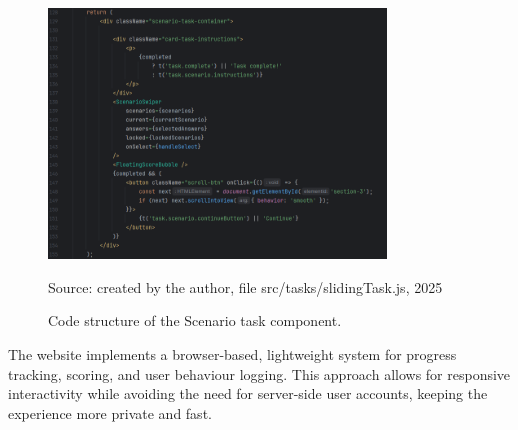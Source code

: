 \begin{figure}[hbtp]
\centering
\includegraphics[width=0.8\textwidth]{Media/task_layout.png}
\caption{Code structure of the Scenario task component.}
\label{fig:task_layout}
{\raggedright \small{Source: created by the author, file src/tasks/slidingTask.js, 2025}\par}
\end{figure}

The website implements a browser-based, lightweight system for progress tracking, scoring, and user behaviour logging. 
This approach allows for responsive interactivity while avoiding the need for server-side user accounts, keeping the experience more private and fast.

